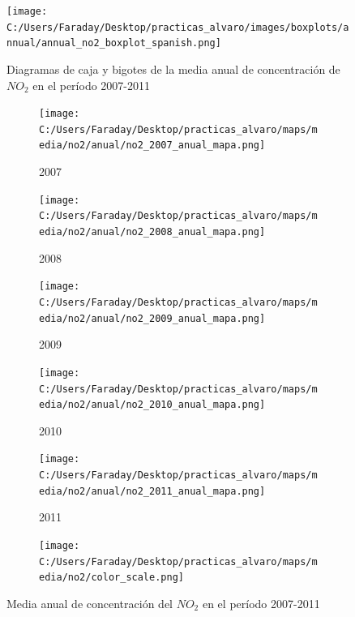 \documentclass[12pt]{article}
\begin{document}
\begin{figure}[H]
\centering
\texttt{[image: C:/Users/Faraday/Desktop/practicas\_alvaro/images/boxplots/annual/annual\_no2\_boxplot\_spanish.png]}
\caption{Diagramas de caja y bigotes de la media anual de concentración de $NO_{2}$ en el período 2007-2011}
\label{fig:box_no2_annual}
\end{figure}

\begin{figure}[H]

\centering
\begin{subfigure}[H]{0.18\textwidth}
\texttt{[image: C:/Users/Faraday/Desktop/practicas\_alvaro/maps/media/no2/anual/no2\_2007\_anual\_mapa.png]}
\captionsetup{labelformat=empty}
\caption{2007}
\end{subfigure}
%
\begin{subfigure}[H]{0.18\textwidth}
\texttt{[image: C:/Users/Faraday/Desktop/practicas\_alvaro/maps/media/no2/anual/no2\_2008\_anual\_mapa.png]}
\captionsetup{labelformat=empty}
\caption{2008}
\end{subfigure}
%
\begin{subfigure}[H]{0.18\textwidth}
\texttt{[image: C:/Users/Faraday/Desktop/practicas\_alvaro/maps/media/no2/anual/no2\_2009\_anual\_mapa.png]}
\captionsetup{labelformat=empty}
\caption{2009}
\end{subfigure}
%
\begin{subfigure}[H]{0.18\textwidth}
\texttt{[image: C:/Users/Faraday/Desktop/practicas\_alvaro/maps/media/no2/anual/no2\_2010\_anual\_mapa.png]}
\captionsetup{labelformat=empty}
\caption{2010}
\end{subfigure}
%
\begin{subfigure}[H]{0.18\textwidth}
\texttt{[image: C:/Users/Faraday/Desktop/practicas\_alvaro/maps/media/no2/anual/no2\_2011\_anual\_mapa.png]}
\captionsetup{labelformat=empty}
\caption{2011}
\end{subfigure}

\begin{subfigure}[H]{0.45\textwidth}
\texttt{[image: C:/Users/Faraday/Desktop/practicas\_alvaro/maps/media/no2/color\_scale.png]}
\captionsetup{labelformat=empty}
\caption{}
\end{subfigure}

\vspace*{-7mm}
\caption{Media anual de concentración del $NO_{2}$ en el período 2007-2011}
\label{fig:map-no2-anual}
\end{figure}
\end{document}
